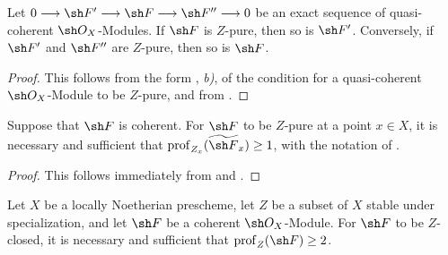 \begin{corollary}[5.10.3]
\label{IV.5.10.3}
Let $0\longrightarrow\sh F'\longrightarrow\sh F
\longrightarrow\sh F''\longrightarrow0$
be an exact sequence of quasi-coherent $\sh O_X$-Modules.  If
$\sh F$ is $Z$-pure, then so is $\sh F'$.  Conversely, if $\sh F'$
and $\sh F''$ are $Z$-pure, then so is $\sh F$.
\end{corollary}


\begin{proof}
This follows from the form , \emph{b)}, of the
condition for a quasi-coherent $\sh O_X$-Module to be $Z$-pure,
and from .
\end{proof}

\begin{corollary}[5.10.4]
\label{IV.5.10.4}
Suppose that $\sh F$ is coherent.  For $\sh F$ to be $Z$-pure at
a point $x\in X$, it is necessary and sufficient that $\operatorname{prof}_{Z_x}(\widetilde{\sh F}_x)\geq1$,
with the notation of .
\end{corollary}

\begin{proof}
This follows immediately from  and
.
\end{proof}

\begin{theorem}[5.10.5]
\label{IV.5.10.5}
Let $X$ be a locally Noetherian prescheme, let $Z$ be a subset of
$X$ stable under specialization, and let $\sh F$ be a coherent
$\sh O_X$-Module.  For $\sh F$ to be $Z$-closed, it is necessary
and sufficient that $\operatorname{prof}_Z(\sh F)\geq2$.
\end{theorem}

